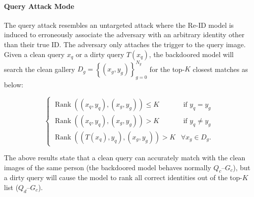 \documentclass[sigconf,authordraft]{acmart}
\begin{document}


\paragraph{Query Attack Mode} The query attack resembles an untargeted attack where the Re-ID model is induced to erroneously associate the adversary with an arbitrary identity other than their true ID. The adversary only attaches the trigger to the query image. Given a clean query $x_q$ or a dirty query $T(x_q)$, the backdoored model will search the clean gallery $D_g=\left\{\left({x}_g, {y}_g\right)\right\}_{g=0}^{N_g}$ for the top-$K$ closest matches as below:
\begin{small}
    \begin{equation}
\begin{cases}\operatorname{Rank}\left(\left(x_q, y_q\right),\left(x_g, y_g\right)\right) \leq K & \text { if } y_q= y_g \\ \operatorname{Rank}\left(\left(x_q, y_q\right),\left(x_g, y_g\right)\right)>K & \text { if } y_q \neq y_g \\ \operatorname{Rank}\left(\left(T\left(x_q\right), y_q\right),\left(x_g, y_g\right)\right)>K & \forall x_g \in D_g.\end{cases}
\end{equation}
\end{small}
The above results state that a clean query can accurately match with the clean images of the same person (the backdoored model behaves normally $Q_{c}$--$G_{c}$), but a dirty query will cause the model to rank all correct identities out of the top-$K$ list ($Q_{d}$--$G_{c}$).
\end{document}
